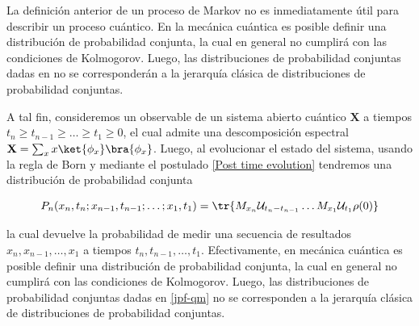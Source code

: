 \begin{Omitir}

La definición anterior de un proceso de Markov no es inmediatamente útil para describir un proceso cuántico. En la mecánica cuántica es posible definir una distribución de probabilidad conjunta, la cual en general no cumplirá con las condiciones de Kolmogorov. Luego, las distribuciones de probabilidad conjuntas dadas en no se corresponderán a la jerarquía clásica de distribuciones de probabilidad conjuntas.

A tal fin, consideremos un observable de un sistema abierto cuántico $\mathbf{
X}$ a tiempos $t_n \geq t_{n-1} \geq \ldots \geq t_1 \geq 0$, el cual admite una descomposición espectral $\mathbf{X} = \sum_{x}x \ket{\phi_x}\bra{\phi_x}$. Luego, al evolucionar el estado del sistema, usando la regla de Born y mediante el postulado \ref{Post time evolution} tendremos una distribución de probabilidad conjunta

\begin{equation}
    P_n(x_n,t_n; x_{n-1},t_{n-1}; \ldots; x_{1},t_{1}) = \tr \{M_{x_n} \mathcal{U}_{t_n - t_{n-1}} \ldots M_{x_1} \mathcal{U}_{t_1} \rho(0)  \}
    \label{jpf-qm}
\end{equation}

la cual devuelve la probabilidad de medir una secuencia de resultados $x_n, x_{n-1},\ldots,x_1$
a tiempos $t_n, t_{n-1},\ldots,t_1$. Efectivamente, en mecánica cuántica es posible definir una distribución de probabilidad conjunta, la cual en general no cumplirá con las condiciones de Kolmogorov. Luego, las distribuciones de probabilidad conjuntas dadas en \eqref{jpf-qm} no se corresponden a la jerarquía clásica de distribuciones de probabilidad conjuntas. 
\end{Omitir}



